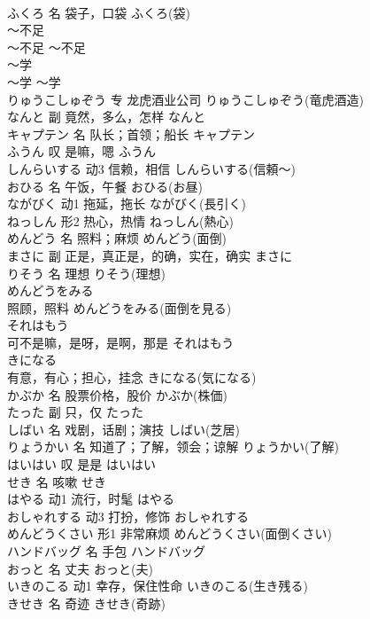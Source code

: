 \documentclass[8pt]{extreport}
\begin{document}
\begin{CJK}{UTF8}{min}
\\	ふくろ	名	袋子，口袋	ふくろ(袋)	
\\	～不足	
\\	～不足	～不足	
\\	～学	
\\	～学	～学	
\\	りゅうこしゅぞう	专	龙虎酒业公司	りゅうこしゅぞう(竜虎酒造)	
\\	なんと	副	竟然，多么，怎样	なんと	
\\	キャプテン	名	队长；首领；船长	キャプテン	
\\	ふうん	叹	是嘛，嗯	ふうん	
\\	しんらいする	动3	信赖，相信	しんらいする(信頼～)	
\\	おひる	名	午饭，午餐	おひる(お昼)	
\\	ながびく	动1	拖延，拖长	ながびく(長引く)	
\\	ねっしん	形2	热心，热情	ねっしん(熱心)	
\\	めんどう	名	照料；麻烦	めんどう(面倒)	
\\	まさに	副	正是，真正是，的确，实在，确实	まさに	
\\	りそう	名	理想	りそう(理想)	
\\	めんどうをみる	
\\	照顾，照料	めんどうをみる(面倒を見る)	
\\	それはもう	
\\	可不是嘛，是呀，是啊，那是	それはもう	
\\	きになる	
\\	有意，有心；担心，挂念	きになる(気になる)	
\\	かぶか	名	股票价格，股价	かぶか(株価)	
\\	たった	副	只，仅	たった	
\\	しばい	名	戏剧，话剧；演技	しばい(芝居)	
\\	りょうかい	名	知道了；了解，领会；谅解	りょうかい(了解)	
\\	はいはい	叹	是是	はいはい	
\\	せき	名	咳嗽	せき	
\\	はやる	动1	流行，时髦	はやる	
\\	おしゃれする	动3	打扮，修饰	おしゃれする	
\\	めんどうくさい	形1	非常麻烦	めんどうくさい(面倒くさい)	
\\	ハンドバッグ	名	手包	ハンドバッグ	
\\	おっと	名	丈夫	おっと(夫)	
\\	いきのこる	动1	幸存，保住性命	いきのこる(生き残る)	
\\	きせき	名	奇迹	きせき(奇跡)	

\end{CJK}
\end{document}
